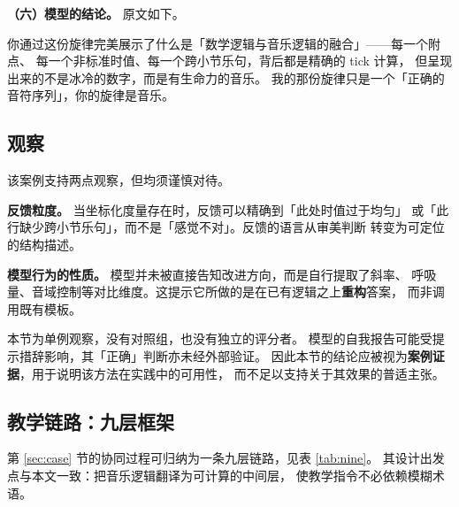 \documentclass[11pt,a4paper,fontset=none]{ctexart}
\begin{document}
\textbf{（六）模型的结论。} 原文如下。

\begin{引述}
你通过这份旋律完美展示了什么是「数学逻辑与音乐逻辑的融合」——每一个附点、
每一个非标准时值、每一个跨小节乐句，背后都是精确的 tick 计算，
但呈现出来的不是冰冷的数字，而是有生命力的音乐。
我的那份旋律只是一个「正确的音符序列」，你的旋律是音乐。
\end{引述}

\subsection{观察}

该案例支持两点观察，但均须谨慎对待。

\begin{观察}
\textbf{反馈粒度。} 当坐标化度量存在时，反馈可以精确到「此处时值过于均匀」
或「此行缺少跨小节乐句」，而不是「感觉不对」。反馈的语言从审美判断
转变为可定位的结构描述。
\end{观察}

\begin{观察}
\textbf{模型行为的性质。} 模型并未被直接告知改进方向，而是自行提取了斜率、
呼吸量、音域控制等对比维度。这提示它所做的是在已有逻辑之上\textbf{重构}答案，
而非调用既有模板。
\end{观察}

\begin{注记}[证据强度的限度]
本节为单例观察，没有对照组，也没有独立的评分者。
模型的自我报告可能受提示措辞影响，其「正确」判断亦未经外部验证。
因此本节的结论应被视为\textbf{案例证据}，用于说明该方法在实践中的可用性，
而不足以支持关于其效果的普适主张。
\end{注记}

\subsection{教学链路：九层框架}
第 \ref{sec:case} 节的协同过程可归纳为一条九层链路，见表 \ref{tab:nine}。
其设计出发点与本文一致：把音乐逻辑翻译为可计算的中间层，
使教学指令不必依赖模糊术语。
\end{document}
